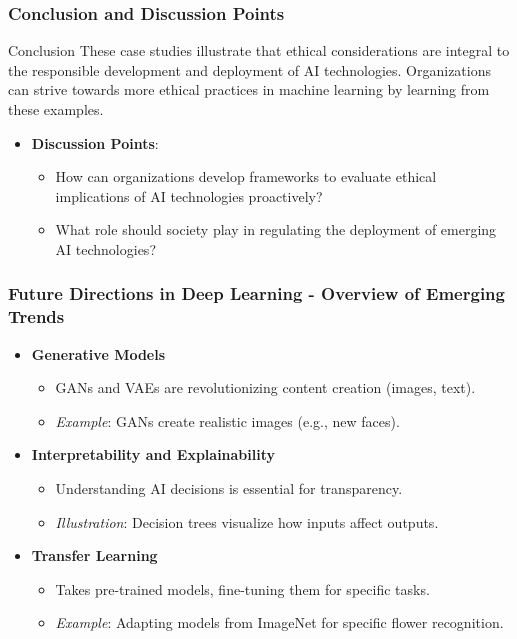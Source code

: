 \documentclass[aspectratio=169]{beamer}
\begin{document}
\begin{frame}[fragile]
    \frametitle{Conclusion and Discussion Points}
    \begin{block}{Conclusion}
        These case studies illustrate that ethical considerations are integral to the responsible development and deployment of AI technologies. 
        Organizations can strive towards more ethical practices in machine learning by learning from these examples. 
    \end{block}
    \begin{itemize}
        \item \textbf{Discussion Points}:
        \begin{itemize}
            \item How can organizations develop frameworks to evaluate ethical implications of AI technologies proactively?
            \item What role should society play in regulating the deployment of emerging AI technologies?
        \end{itemize}
    \end{itemize}
\end{frame}

\begin{frame}[fragile]
    \frametitle{Future Directions in Deep Learning - Overview of Emerging Trends}
    \begin{itemize}
        \item \textbf{Generative Models}
        \begin{itemize}
            \item GANs and VAEs are revolutionizing content creation (images, text).
            \item \textit{Example}: GANs create realistic images (e.g., new faces).
        \end{itemize}
        
        \item \textbf{Interpretability and Explainability}
        \begin{itemize}
            \item Understanding AI decisions is essential for transparency.
            \item \textit{Illustration}: Decision trees visualize how inputs affect outputs.
        \end{itemize}

        \item \textbf{Transfer Learning}
        \begin{itemize}
            \item Takes pre-trained models, fine-tuning them for specific tasks.
            \item \textit{Example}: Adapting models from ImageNet for specific flower recognition.
        \end{itemize}
    \end{itemize}
\end{frame}
\end{document}
